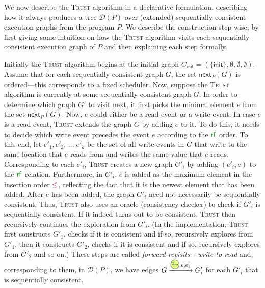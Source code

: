 \documentclass[acmsmall]{acmart}
\newcommand{\trust}{\textsc{Trust}\xspace}
\newcommand{\init}{\mathsf{init}}
\newcommand{\nextop}{\mathsf{next}}
\newcommand{\rf}[1]{{\textcolor{green!60!black}{\mathsf{rf}}_{#1}}}
\newcommand{\inord}{\textcolor{purple}\leq}
\newcommand{\fwdtikz}{%
  \tikz[baseline=(char.base)]{
    \node[shape=circle, draw, fill=lime!50, inner sep=0.15pt] (char) {$\looparrowright$};
  }
}
\begin{document}
We now describe the \trust algorithm in a declarative formulation, describing how it always produces a tree $\mathcal{D}(P)$ over (extended) sequentially consistent execution graphs from the program $P$. 
We describe the construction step-wise, by first giving some intuition on how the \trust algorithm visits each sequentially consistent execution graph of $P$ and then explaining each step formally.

Initially the \trust algorithm begins at the initial graph $G_\init = (\{\init\},\emptyset,\emptyset,\emptyset)$.
Assume that for each sequentially consistent graph $G$, the set $\nextop_{P}(G)$ is ordered---this corresponds to a fixed scheduler. Now, suppose the \trust algorithm
is currently at some sequentially consistent graph $G$. In order to determine which graph $G'$ to visit next, it first picks the minimal element $e$ from the set $\nextop_{P}(G)$. Now, $e$ could either be a read event or a write event. In case $e$ is a read event, \trust extends the graph $G$ by adding $e$ to it. To do this, it needs to decide which write event precedes the event $e$ according to the $\rf{}$ order.
To this end, let $e'_1,e'_2,\dots,e'_k$ be the set of all write events in $G$ that write to the same location that $e$ reads from and writes the same value that $e$ reads. Corresponding to each $e'_i$,
\trust creates a new graph $G'_i$ by adding $(e'_i,e)$ to the $\rf{}$ relation. Furthermore, in $G'_i$, $e$ is added as the maximum element in the insertion order $\inord$, reflecting the fact that it is the newest element that has been added. After $e$ has been added, the graph $G'_i$ need not necessarily be sequentially consistent. Thus, \trust also uses an oracle (consistency checker) to check if $G'_i$ is sequentially consistent. If it indeed turns out to be consistent, \trust then recursively continues the exploration from $G'_i$. (In the implementation, \trust first constructs $G'_1$, checks if it is consistent and if so, recursively explores from $G'_1$, then it constructs $G'_2$, checks if it is consistent and if so, recursively explores from $G'_2$ and so on.) These steps are called \emph{forward revisits - write to read} and, corresponding to them, in $\mathcal{D}(P)$, we have edges $G \xrightarrow{\fwdtikz, e, e'_i} G'_i$ for each $G'_i$ that is sequentially consistent.
\end{document}
